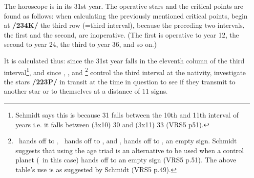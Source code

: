 The horoscope is in its 31st year. The operative stars and the critical points are found as follows: when calculating the previously mentioned critical points, begin at \textbf{/234K/} the third row (=third interval), because the preceding two intervals, the first and the second, are inoperative. (The first is operative to year 12, the second to year 24, the third to year 36, and so on.) 

It is calculated thus: since the 31st year falls in the eleventh column of the third interval\footnote{Schmidt says this is because 31 falls between the 10th and 11th interval of years i.e. it falls between (3x10) 30 and (3x11) 33 (VRS5 p51).}, and since \Saturn, \Jupiter, and \Venus\footnote{\tiny\Saturn\, hands off to \Jupiter, \Jupiter\, hands off to \Venus, and \Venus, hands off to \Pisces, an empty sign.  Schmidt suggests that using the age triad is an alternative to be used when a control planet (\Venus\, in this case) hands off to an empty sign (VRS5 p.51). The above table's use is as suggested by Schmidt (VRS5 p.49).} control the third interval at the nativity, investigate the stars \textbf{/223P/} in transit at the time in question to see if they transmit to another star or to themselves at a distance of 11 signs. 

